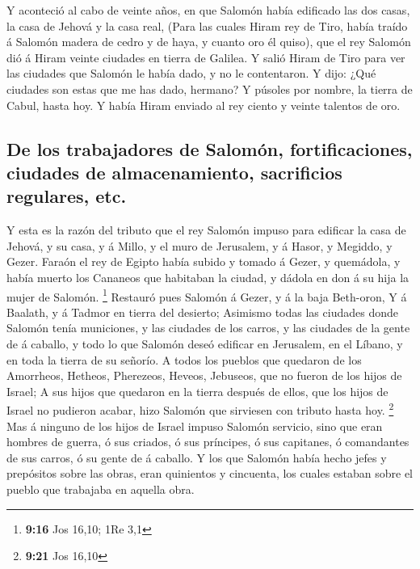  Y aconteció al cabo de veinte años, en que Salomón había
edificado las dos casas, la casa de Jehová y la casa real,
 (Para las cuales Hiram rey de Tiro, había traído á
Salomón madera de cedro y de haya, y cuanto oro él quiso), que el rey
Salomón dió á Hiram veinte ciudades en tierra de Galilea.
 Y salió Hiram de Tiro para ver las ciudades que Salomón
le había dado, y no le contentaron.  Y dijo: ¿Qué
ciudades son estas que me has dado, hermano? Y púsoles por nombre, la
tierra de Cabul, hasta hoy.  Y había Hiram enviado al rey
ciento y veinte talentos de oro.

\hypertarget{de-los-trabajadores-de-salomuxf3n-fortificaciones-ciudades-de-almacenamiento-sacrificios-regulares-etc.}{%
\subsection{De los trabajadores de Salomón, fortificaciones, ciudades de
almacenamiento, sacrificios regulares,
etc.}\label{de-los-trabajadores-de-salomuxf3n-fortificaciones-ciudades-de-almacenamiento-sacrificios-regulares-etc.}}

 Y esta es la razón del tributo que el rey Salomón impuso
para edificar la casa de Jehová, y su casa, y á Millo, y el muro de
Jerusalem, y á Hasor, y Megiddo, y Gezer.  Faraón el rey
de Egipto había subido y tomado á Gezer, y quemádola, y había muerto los
Cananeos que habitaban la ciudad, y dádola en don á su hija la mujer de
Salomón. \footnote{\textbf{9:16} Jos 16,10; 1Re 3,1} 
Restauró pues Salomón á Gezer, y á la baja Beth-oron,  Y
á Baalath, y á Tadmor en tierra del desierto;  Asimismo
todas las ciudades donde Salomón tenía municiones, y las ciudades de los
carros, y las ciudades de la gente de á caballo, y todo lo que Salomón
deseó edificar en Jerusalem, en el Líbano, y en toda la tierra de su
señorío.  A todos los pueblos que quedaron de los
Amorrheos, Hetheos, Pherezeos, Heveos, Jebuseos, que no fueron de los
hijos de Israel;  A sus hijos que quedaron en la tierra
después de ellos, que los hijos de Israel no pudieron acabar, hizo
Salomón que sirviesen con tributo hasta hoy. \footnote{\textbf{9:21} Jos
  16,10}  Mas á ninguno de los hijos de Israel impuso
Salomón servicio, sino que eran hombres de guerra, ó sus criados, ó sus
príncipes, ó sus capitanes, ó comandantes de sus carros, ó su gente de á
caballo.  Y los que Salomón había hecho jefes y
prepósitos sobre las obras, eran quinientos y cincuenta, los cuales
estaban sobre el pueblo que trabajaba en aquella obra.

